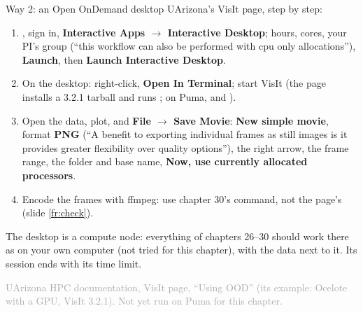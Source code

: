 \documentclass[aspectratio=169,11pt]{beamer}
\newcommand{\sourcecredit}[1]{\vfill\begin{flushright}\tiny\textcolor{DarkGray}{#1}\end{flushright}}
\newcommand{\gui}[1]{\textsf{\textbf{#1}}}
\begin{document}
\begin{frame}{Way 2: an Open OnDemand desktop}
\label{fr:ood}
\footnotesize
UArizona's VisIt page, step by step:
\begin{enumerate}\setlength{\itemsep}{1pt}
  \item {}, sign in, \gui{Interactive Apps $\to$ Interactive Desktop}; hours, cores, your PI's group (``this workflow can also be performed with cpu only allocations''), \gui{Launch}, then \gui{Launch Interactive Desktop}.
  \item On the desktop: right-click, \gui{Open In Terminal}; start VisIt (the page installs a 3.2.1 tarball and runs ; on Puma,  and ).
  \item Open the data, plot, and \gui{File $\to$ Save Movie}: \gui{New simple movie}, format \gui{PNG} (``A benefit to exporting individual frames as still images is it provides greater flexibility over quality options''), the right arrow, the frame range, the folder and base name, \gui{Now, use currently allocated processors}.
  \item Encode the frames with ffmpeg: use chapter 30's command, not the page's (slide \ref{fr:check}).
\end{enumerate}
\vspace{1mm}
The desktop is a compute node: everything of chapters 26--30 should work there as on your own computer (not tried for this chapter), with the data next to it. Its session ends with its time limit.
\sourcecredit{UArizona HPC documentation, VisIt page, ``Using OOD'' (its example: Ocelote with a GPU, VisIt 3.2.1). Not yet run on Puma for this chapter.}
\end{frame}
\end{document}
